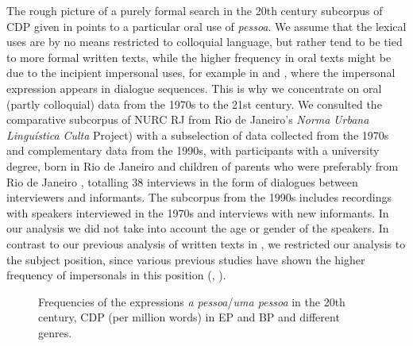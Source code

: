 \documentclass[output=paper]{langscibook}
\begin{document}
{The rough picture of a purely formal search in the 20th century subcorpus of CDP given in  points to a particular oral use of} {\textit{pessoa}}{. We assume that the lexical uses are by no means restricted to colloquial language, but rather tend to be tied to more formal written texts, while the higher frequency in oral texts might be due to the incipient impersonal uses, for example in  and , where the impersonal expression appears in dialogue sequences. This is why we concentrate on oral (partly colloquial) data from the 1970s to the 21st century. We consulted the comparative subcorpus of NURC RJ from Rio de Janeiro’s} {\textit{Norma}} \emph{Urbana Linguística}{ \textit{Culta}} Project) with a subselection of data collected from the 1970s and complementary data from the 1990s, with participants with a university degree, born in Rio de Janeiro and children of parents who were preferably from Rio de Janeiro \citep{BarbosaLopesCallou2021}, totalling 38 interviews in the form of dialogues between interviewers and informants. The subcorpus from the 1990s includes recordings with speakers interviewed in the 1970s and interviews with new informants. In our analysis we did not take into account the age or gender of the speakers. In contrast to our previous analysis of written texts in , we restricted our analysis to the subject position, since various previous studies have shown the higher frequency of impersonals in this position (\citealt{AmaralMihatsch2019}, \citealt{Posio2021}).


\begin{figure}
  \caption{\label{fig:amaral:1}Frequencies of the expressions \textit{a pessoa}/\textit{uma pessoa} in the 20th century, CDP (per million words) in EP and BP and different genres.}
\end{figure}
\end{document}
